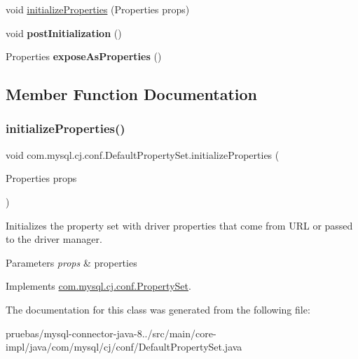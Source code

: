 \begin{DoxyCompactItemize}
void \mbox{\hyperlink{classcom_1_1mysql_1_1cj_1_1conf_1_1_default_property_set_aca8a98e7e0fa72d07fde37a0e7b03fbe}{initialize\+Properties}} (Properties props)
\item 
\mbox{\label{classcom_1_1mysql_1_1cj_1_1conf_1_1_default_property_set_a56846f6e28845150a83181734f800215}} 
void {\bfseries post\+Initialization} ()
\item 
\mbox{\label{classcom_1_1mysql_1_1cj_1_1conf_1_1_default_property_set_ace49d9662de4376583ef44bc172e71fe}} 
Properties {\bfseries expose\+As\+Properties} ()
\end{DoxyCompactItemize}


\subsection{Member Function Documentation}
\mbox{\label{classcom_1_1mysql_1_1cj_1_1conf_1_1_default_property_set_aca8a98e7e0fa72d07fde37a0e7b03fbe}} 
\subsubsection{\texorpdfstring{initialize\+Properties()}{initializeProperties()}}
{\footnotesize\ttfamily void com.\+mysql.\+cj.\+conf.\+Default\+Property\+Set.\+initialize\+Properties (\begin{DoxyParamCaption}\item[{Properties}]{props }\end{DoxyParamCaption})}

Initializes the property set with driver properties that come from U\+RL or passed to the driver manager.


\begin{DoxyParams}{Parameters}
{\em props} & properties \\
\hline
\end{DoxyParams}


Implements \mbox{\hyperlink{interfacecom_1_1mysql_1_1cj_1_1conf_1_1_property_set_a4d0959318c1dd50f8d73a4aabcacd2ae}{com.\+mysql.\+cj.\+conf.\+Property\+Set}}.



The documentation for this class was generated from the following file\+:\begin{DoxyCompactItemize}
\item 
pruebas/mysql-\/connector-\/java-\/8../src/main/core-\/impl/java/com/mysql/cj/conf/Default\+Property\+Set.\+java\end{DoxyCompactItemize}
